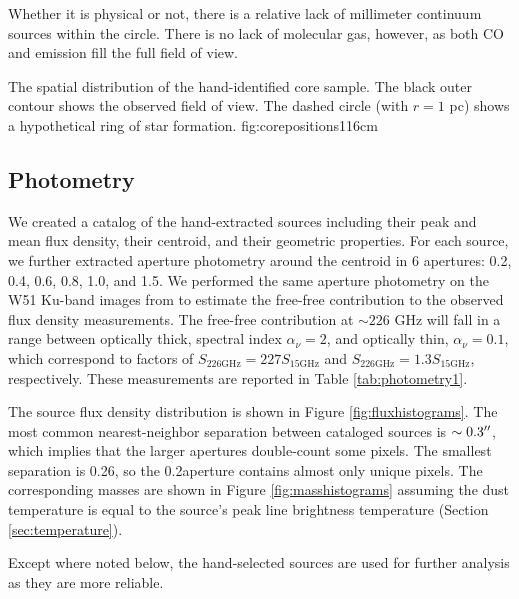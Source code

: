 \documentclass{aa}
\begin{document}
Whether it is physical or not, there is a relative lack of millimeter continuum
sources within the circle.  There is no lack of molecular gas, however, as both
CO and \formaldehyde emission fill the full field of view.

{The spatial distribution of the hand-identified core sample.
The black outer contour shows the observed field of view.  The dashed circle
(with $r=1$ pc) shows a hypothetical ring of star formation.
}{fig:corepositions}{1}{16cm}


\subsection{Photometry}
\label{sec:photometry}
We created a catalog of the hand-extracted sources including their peak and mean
flux density, their centroid, and their geometric properties.  For each source,
we further extracted aperture photometry around the centroid in 6 apertures:
0.2, 0.4, 0.6, 0.8, 1.0, and 1.5\arcsec.  We performed the same aperture
photometry on the W51 Ku-band images from \citet{Ginsburg2016a} to estimate the
free-free contribution to the observed flux density measurements.  The
free-free contribution at $\sim226$ GHz will fall in a range between optically
thick, spectral index $\alpha_\nu=2$, and optically thin, $\alpha_\nu=0.1$,
which correspond to factors of $S_{226 \mathrm{GHz}} = 227 S_{15 \mathrm{GHz}}$
and $S_{226 \mathrm{GHz}} = 1.3 S_{15 \mathrm{GHz}}$, respectively.  These
measurements are reported in Table
\ref{tab:photometry1}.

The source flux density distribution is shown in Figure
\ref{fig:fluxhistograms}.  The most common nearest-neighbor separation between
cataloged sources is $\sim0.3\mbox{$^{\prime\prime}$}$, which implies that the larger apertures
double-count some pixels.  The smallest separation is 0.26\arcsec, so the
0.2\arcsec aperture contains almost only unique pixels.  The corresponding
masses are shown in Figure \ref{fig:masshistograms} assuming the dust
temperature is equal to the source's peak line brightness temperature (Section
\ref{sec:temperature}).


Except where noted below, the hand-selected sources are used for further
analysis as they are more reliable.



\end{document}

